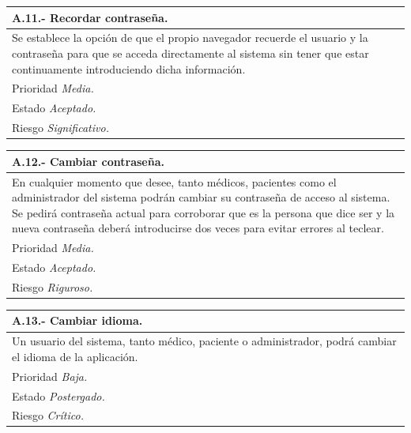 \documentclass[a4paper,oneside,11pt]{book}
\begin{document}
\begin{center}
\begin{tabulary}{15cm}{|L|}
	\hline
		\bf{A.11.- Recordar contraseña.} \\
	\hline
		Se establece la opción de que el propio navegador recuerde el usuario y la contraseña para que se acceda directamente al sistema sin tener que estar continuamente introduciendo dicha información. \\
	\hline
		Prioridad \textit{Media.} \\
	\hline
		Estado \textit{Aceptado.} \\
	\hline
		Riesgo \textit{Significativo.} \\
	\hline
\end{tabulary}
\end{center}

\begin{center}
\begin{tabulary}{15cm}{|L|}
	\hline
		\bf{A.12.- Cambiar contraseña.} \\
	\hline
		En cualquier momento que desee, tanto médicos, pacientes como el administrador del sistema podrán cambiar su contraseña de acceso al sistema. Se pedirá contraseña actual para corroborar que es la persona que dice ser y la nueva contraseña deberá introducirse dos veces para evitar errores al teclear. \\
	\hline
		Prioridad \textit{Media.} \\
	\hline
		Estado \textit{Aceptado.} \\
	\hline
		Riesgo \textit{Riguroso.} \\
	\hline
\end{tabulary}
\end{center}

\begin{center}
\begin{tabulary}{15cm}{|L|}
	\hline
		\bf{A.13.- Cambiar idioma.} \\
	\hline
		Un usuario del sistema, tanto médico, paciente o administrador, podrá cambiar el idioma de la aplicación. \\
	\hline
		Prioridad \textit{Baja.} \\
	\hline
		Estado \textit{Postergado.} \\
	\hline
		Riesgo \textit{Crítico.} \\
	\hline
\end{tabulary}
\end{center}
\end{document}
